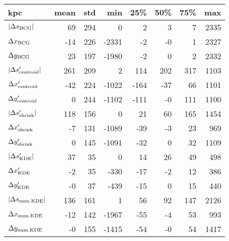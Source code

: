 \begin{tabular}{lrrrrrrr}
\toprule
kpc &  mean &  std &   min &  25\% &  50\% &  75\% &  max \\
\midrule
$|\Delta s_{\rm BCG}|$       &    69 &  294 &     0 &    2 &    3 &    7 & 2335 \\
$\Delta x_{\rm BCG}$         &   -14 &  226 & -2331 &   -2 &   -0 &    1 & 2327 \\
$\Delta y_{\rm BCG}$         &    23 &  197 & -1980 &   -2 &    0 &    2 & 2332 \\
$|\Delta s_{\rm centroid}'|$ &   261 &  209 &     2 &  114 &  202 &  317 & 1103 \\
$\Delta x_{\rm centroid}'$   &   -42 &  224 & -1022 & -164 &  -37 &   66 & 1101 \\
$\Delta y_{\rm centroid}'$   &     0 &  244 & -1102 & -111 &   -0 &  111 & 1100 \\
$|\Delta s_{\rm shrink}'|$   &   118 &  156 &     0 &   21 &   60 &  165 & 1454 \\
$\Delta x_{\rm shrink}'$     &    -7 &  131 & -1089 &  -39 &   -3 &   23 &  969 \\
$\Delta y_{\rm shrink}'$     &     0 &  145 & -1091 &  -32 &    0 &   32 & 1109 \\
$|\Delta s_{\rm KDE}'|$      &    37 &   35 &     0 &   14 &   26 &   49 &  498 \\
$\Delta x_{\rm KDE}'$        &    -2 &   35 &  -330 &  -17 &   -2 &   12 &  386 \\
$\Delta y_{\rm KDE}'$        &    -0 &   37 &  -439 &  -15 &    0 &   15 &  440 \\
$|\Delta s_{\rm num. KDE}|$    &   136 &  161 &     1 &   56 &   92 &  147 & 2126 \\
$\Delta x_{\rm num. KDE}$    &   -12 &  142 & -1967 &  -55 &   -4 &   53 &  993 \\
$\Delta y_{\rm num. KDE}$    &    -0 &  155 & -1415 &  -54 &   -0 &   54 & 1417 \\
\bottomrule
\end{tabular}
